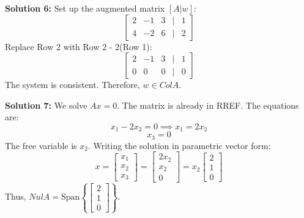 \documentclass[11pt]{article}
\begin{document}
\vspace{0.3cm}
\textbf{Solution 6:} Set up the augmented matrix $[A | w]$:
$$ \begin{bmatrix} 2 & -1 & 3 & | & 1 \\ 4 & -2 & 6 & | & 2 \end{bmatrix} $$
Replace Row 2 with Row 2 - 2(Row 1):
$$ \begin{bmatrix} 2 & -1 & 3 & | & 1 \\ 0 & 0 & 0 & | & 0 \end{bmatrix} $$
The system is consistent. Therefore, $w \in Col A$.

\vspace{0.3cm}
\textbf{Solution 7:} We solve $Ax = 0$. The matrix is already in RREF. The equations are:
$$ x_1 - 2x_2 = 0 \implies x_1 = 2x_2 $$
$$ x_3 = 0 $$
The free variable is $x_2$. Writing the solution in parametric vector form:
$$ x = \begin{bmatrix} x_1 \\ x_2 \\ x_3 \end{bmatrix} = \begin{bmatrix} 2x_2 \\ x_2 \\ 0 \end{bmatrix} = x_2 \begin{bmatrix} 2 \\ 1 \\ 0 \end{bmatrix} $$
Thus, $Nul A = \text{Span} \left\{ \begin{bmatrix} 2 \\ 1 \\ 0 \end{bmatrix} \right\}$.
\end{document}
